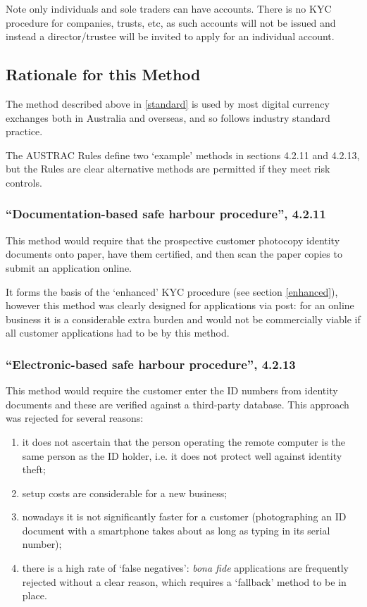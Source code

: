 \documentclass[12pt]{report}
\begin{document}
Note only individuals and sole traders can have accounts. There is no KYC procedure for companies, trusts, etc, as such accounts will
not be issued and instead a director/trustee will be invited to apply for an individual account.

\subsection{Rationale for this Method}

The method described above in \ref{standard} is used by most digital currency exchanges both in Australia and overseas, and so follows
industry standard practice.

The AUSTRAC Rules define two `example' methods in sections 4.2.11 and 4.2.13, but the Rules are clear alternative methods are permitted
if they meet risk controls.

\subsubsection{``Documentation-based safe harbour procedure'', 4.2.11}

This method would require that the prospective customer photocopy
identity documents onto paper, have them certified, and then scan the paper copies to submit an application online.

It forms the basis of the `enhanced' KYC procedure (see section \ref{enhanced}), however this method was clearly designed for
applications via post: for an online business it is a considerable extra burden and would not be commercially viable if all customer
applications had to be by this method.

\subsubsection{``Electronic-based safe harbour procedure'', 4.2.13}

This method would require the customer enter the ID numbers from identity documents and these
are verified against a third-party database. This approach was rejected for several reasons:
\begin{enumerate}
\item it does not ascertain that the person operating the remote computer is the same person as the ID holder, i.e. it does not protect well against identity theft;
\item setup costs are considerable for a new business;
\item nowadays it is not significantly faster for a customer (photographing an ID document with a smartphone takes about as long as typing in its serial number);
\item there is a high rate of `false negatives': \emph{bona fide} applications are frequently rejected without a clear reason, which requires a `fallback' method
to  be in place. 
\end{enumerate}
\end{document}
